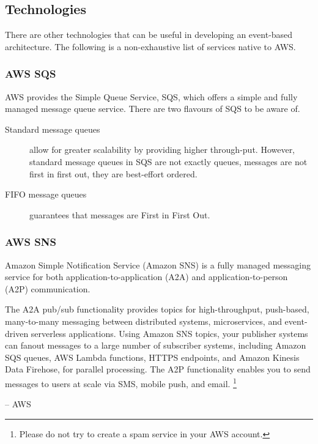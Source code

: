 \documentclass{csse4400}
\begin{document}
\subsection{Technologies}

There are other technologies that can be useful in developing an event-based architecture.
The following is a non-exhaustive list of services native to AWS.

\subsubsection{AWS SQS}

AWS provides the Simple Queue Service, SQS,
which offers a simple and fully managed message queue service.
There are two flavours of SQS to be aware of.
\begin{description}
    \item[Standard message queues] allow for greater scalability by providing higher through-put.
However, standard message queues in SQS are not exactly queues,
messages are not first in first out,
they are best-effort ordered.
    \item[FIFO message queues] guarantees that messages are First in First Out.
\end{description}

\subsubsection{AWS SNS}
\begin{oldquote}
Amazon Simple Notification Service (Amazon SNS) is a fully managed messaging service for both application-to-application (A2A) and application-to-person (A2P) communication.

The A2A pub/sub functionality provides topics for high-throughput,
push-based, many-to-many messaging between distributed systems,
microservices, and event-driven serverless applications.
Using Amazon SNS topics,
your publisher systems can fanout messages to a large number of subscriber systems,
including Amazon SQS queues, AWS Lambda functions,
HTTPS endpoints, and Amazon Kinesis Data Firehose,
for parallel processing.
The A2P functionality enables you to send messages to users at scale via SMS, mobile push, and email.%
\footnote{Please do not try to create a spam service in your AWS account.}

\raggedleft -- AWS
\end{oldquote}
\end{document}
